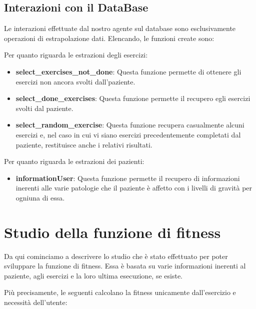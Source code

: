 \documentclass{article}
\begin{document}
\pagebreak

    \subsection{Interazioni con il DataBase}
    Le interazioni effettuate dal nostro agente sul database sono esclusivamente operazioni di estrapolazione dati. Elencando, le funzioni create sono:

    
    Per quanto riguarda le estrazioni degli esercizi:
    \begin{itemize}
        \item\textbf{select\_exercises\_not\_done}: Questa funzione permette di ottenere gli esercizi non ancora svolti dall'paziente.

        \item\textbf{select\_done\_exercises}: Questa funzione permette il recupero egli esercizi svolti dal paziente.

        \item\textbf{select\_random\_exercise}: Questa funzione recupera casualmente alcuni esercizi e, nel caso in cui vi siano esercizi precedentemente completati dal paziente, restituisce anche i relativi risultati.

    \end{itemize}
    Per quanto riguarda le estrazioni dei pazienti:
    \begin{itemize}
        \item\textbf{informationUser}: Questa funzione permette il recupero di informazioni inerenti alle varie patologie che il paziente è affetto con i livelli di gravità per ogniuna di essa.

    \end{itemize}

\pagebreak

    \section{Studio della funzione di fitness}
    Da qui cominciamo a descrivere lo studio che è stato effettuato per poter sviluppare la funzione di fitness. Essa è basata su varie informazioni inerenti al paziente, agli esercizi e la loro ultima esecuzione, se esiste. 
    
    Più precisamente, le seguenti calcolano la fitness unicamente dall'esercizio e necessità dell'utente:
\end{document}
